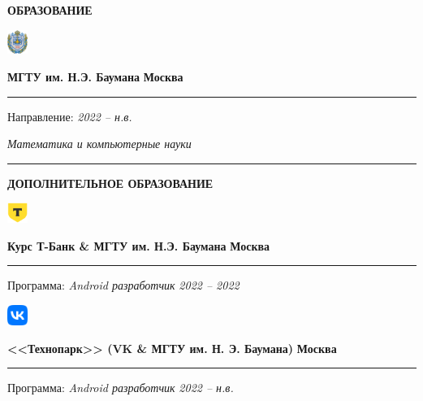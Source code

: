 \documentclass[a4paper, 10pt]{extarticle}
\begin{document}
\begin{paracol}{2}
\begin{rightcolumn}
            \noindent\textbf{ОБРАЗОВАНИЕ}
            \vspace{1em}

            \noindent\parbox{0.1\columnwidth}{
                \includegraphics[width=0.05\textwidth]{img/bmstu_logo.png}
            }
            \parbox{0.85\columnwidth}{
                \textbf{МГТУ им. Н.Э. Баумана}
                \hfill \textbf{Москва}
                \vspace{0.5em}
                \hrule
                \vspace{0.5em}

                Направление: \hfill \textit{2022 -- н.в.} 
                
                \textit{Математика и компьютерные науки}
            }

            \noindent\rule{\columnwidth}{2pt}

            \noindent\textbf{ДОПОЛНИТЕЛЬНОЕ ОБРАЗОВАНИЕ}

            \noindent\parbox{0.1\columnwidth}{
                \includegraphics[width=0.05\textwidth]{img/tbank_logo.png}
            }
            \parbox{0.85\columnwidth}{
                \textbf{Курс Т-Банк \& МГТУ им. Н.Э. Баумана}
                \hfill \textbf{Москва}
                \hrule
                \vspace{0.5em}

                Программа: \textit{Android разработчик}
                \hfill \textit{2022 -- 2022} 
            }
            \vspace{1em}

            \noindent\parbox{0.1\columnwidth}{
                \includegraphics[width=0.05\textwidth]{img/vk_logo.png}
            }
            \parbox{0.85\columnwidth}{
                \textbf{<<Технопарк>> (VK \& МГТУ им. Н. Э. Баумана)}
                \hfill \textbf{Москва}
                \hrule
                \vspace{0.5em}

                Программа: \textit{Android разработчик}
                \hfill \textit{2022 -- н.в.} 
            }
        \end{rightcolumn}
    \end{paracol}
\end{document}
